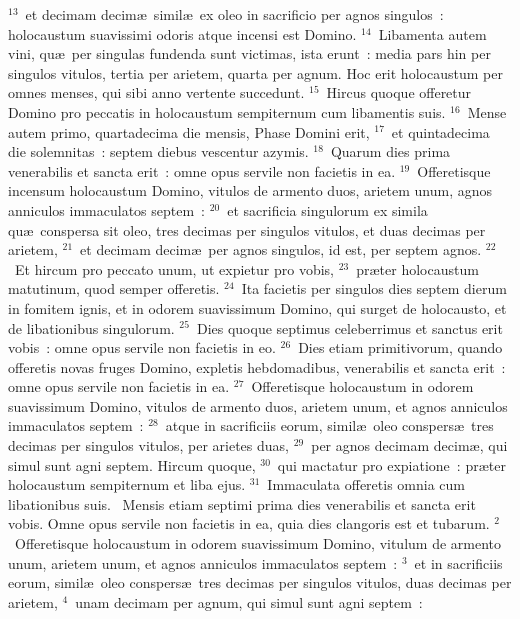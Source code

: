 ${}^{13}$~et decimam decim\ae\ simil\ae\ ex oleo in sacrificio per agnos singulos~: holocaustum suavissimi odoris atque incensi est Domino.
${}^{14}$~Libamenta autem vini, qu\ae\ per singulas fundenda sunt victimas, ista erunt~: media pars hin per singulos vitulos, tertia per arietem, quarta per agnum. Hoc erit holocaustum per omnes menses, qui sibi anno vertente succedunt.
${}^{15}$~Hircus quoque offeretur Domino pro peccatis in holocaustum sempiternum cum libamentis suis.
${}^{16}$~Mense autem primo, quartadecima die mensis, Phase Domini erit,
${}^{17}$~et quintadecima die solemnitas~: septem diebus vescentur azymis.
${}^{18}$~Quarum dies prima venerabilis et sancta erit~: omne opus servile non facietis in ea.
${}^{19}$~Offeretisque incensum holocaustum Domino, vitulos de armento duos, arietem unum, agnos anniculos immaculatos septem~:
${}^{20}$~et sacrificia singulorum ex simila qu\ae\ conspersa sit oleo, tres decimas per singulos vitulos, et duas decimas per arietem,
${}^{21}$~et decimam decim\ae\ per agnos singulos, id est, per septem agnos.
${}^{22}$~Et hircum pro peccato unum, ut expietur pro vobis,
${}^{23}$~pr\ae ter holocaustum matutinum, quod semper offeretis.
${}^{24}$~Ita facietis per singulos dies septem dierum in fomitem ignis, et in odorem suavissimum Domino, qui surget de holocausto, et de libationibus singulorum.
${}^{25}$~Dies quoque septimus celeberrimus et sanctus erit vobis~: omne opus servile non facietis in eo.
${}^{26}$~Dies etiam primitivorum, quando offeretis novas fruges Domino, expletis hebdomadibus, venerabilis et sancta erit~: omne opus servile non facietis in ea.
${}^{27}$~Offeretisque holocaustum in odorem suavissimum Domino, vitulos de armento duos, arietem unum, et agnos anniculos immaculatos septem~:
${}^{28}$~atque in sacrificiis eorum, simil\ae\ oleo conspers\ae\ tres decimas per singulos vitulos, per arietes duas,
${}^{29}$~per agnos decimam decim\ae , qui simul sunt agni septem. Hircum quoque,
${}^{30}$~qui mactatur pro expiatione~: pr\ae ter holocaustum sempiternum et liba ejus.
${}^{31}$~Immaculata offeretis omnia cum libationibus suis.
~Mensis etiam septimi prima dies venerabilis et sancta erit vobis. Omne opus servile non facietis in ea, quia dies clangoris est et tubarum.
${}^{2}$~Offeretisque holocaustum in odorem suavissimum Domino, vitulum de armento unum, arietem unum, et agnos anniculos immaculatos septem~:
${}^{3}$~et in sacrificiis eorum, simil\ae\ oleo conspers\ae\ tres decimas per singulos vitulos, duas decimas per arietem,
${}^{4}$~unam decimam per agnum, qui simul sunt agni septem~:
